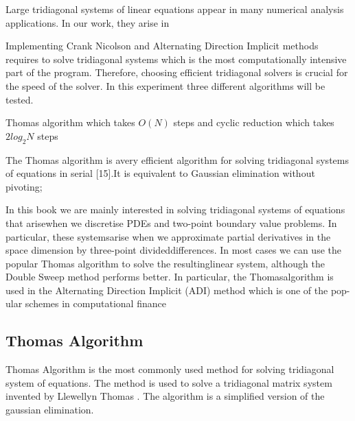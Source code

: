\documentclass[12pt, oneside]{book}
\theoremstyle{plain}
\theoremstyle{definition}
\begin{document}
Large tridiagonal systems of linear equations appear in many numerical analysis applications. In our work, they arise in 

Implementing Crank Nicolson and Alternating Direction Implicit methods requires to solve tridiagonal systems which is the most computationally intensive part of the program.  Therefore, choosing efficient tridiagonal solvers is crucial for the speed of the solver. In this experiment three different algorithms will be tested.

Thomas algorithm which takes $O(N)$ steps and cyclic reduction which takes $2log_2 N$ steps

The Thomas algorithm is avery efficient algorithm for solving tridiagonal systems of equations in serial [15].It is equivalent to Gaussian elimination without pivoting;
\cite{duffycpp}

In this book we are mainly interested in solving tridiagonal systems of equations that arisewhen we discretise PDEs and two-point boundary value problems. In particular, these systemsarise when we approximate partial derivatives in the space dimension by three-point divideddifferences. In most cases we can use the popular Thomas algorithm to solve the resultinglinear system, although the Double Sweep method performs better. In particular, the Thomasalgorithm is used in the Alternating Direction Implicit (ADI) method which is one of the pop-ular schemes in computational finance

\subsection{Thomas Algorithm}
Thomas Algorithm is the most commonly used method for solving tridiagonal system of equations. The method is used to solve a tridiagonal matrix system invented by Llewellyn Thomas \cite{thomas}. The algorithm is a simplified version of the gaussian elimination.
\end{document}

